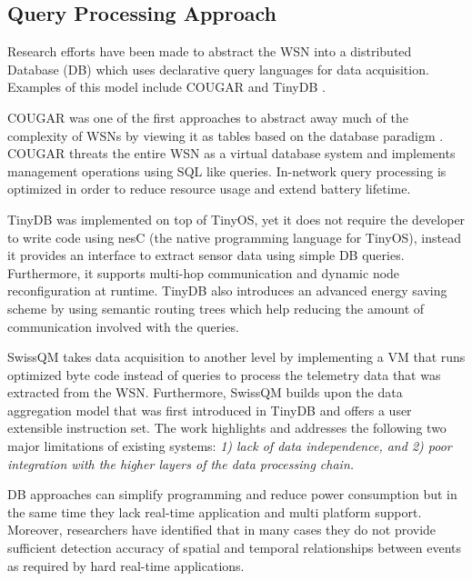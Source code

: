 \subsection{Query Processing Approach}
Research efforts have been made to abstract the WSN into a distributed Database (DB) which uses declarative query languages for data acquisition. Examples of this model include COUGAR \cite{yao2002cougar} and TinyDB \cite{madden2005tinydb}.

COUGAR was one of the first approaches to abstract away much of the
complexity of WSNs by viewing it as tables based on the database paradigm . COUGAR threats the entire WSN as a virtual database system and implements management operations using SQL like queries. In-network query processing is optimized in order to reduce resource usage and extend battery lifetime.  

TinyDB was implemented on top of TinyOS, yet it does not require the developer to write code using nesC (the native programming language for TinyOS), instead it provides an interface to extract sensor data using simple DB queries. Furthermore, it supports multi-hop communication and dynamic node reconfiguration at runtime. TinyDB also introduces an advanced energy saving scheme by using semantic routing trees which help reducing the amount of communication involved with the queries.

SwissQM \cite{mueller2007swissqm} takes data acquisition to another level by implementing a VM that runs optimized byte code instead of queries to process the telemetry data that was extracted from the WSN. Furthermore, SwissQM builds upon the data aggregation model that was first introduced in TinyDB and offers a user extensible instruction set. The work highlights and addresses the following two major limitations of existing systems: \emph{1) lack of data independence, and 2) poor integration with the higher layers of the data processing chain.}

DB approaches can simplify programming and reduce power consumption but in the same time they lack real-time application and multi platform support. Moreover, researchers have identified \cite{hadim2006middleware,yick2008wireless} that in many cases they do not provide sufficient detection accuracy of spatial and temporal relationships between events as required by hard real-time applications.
